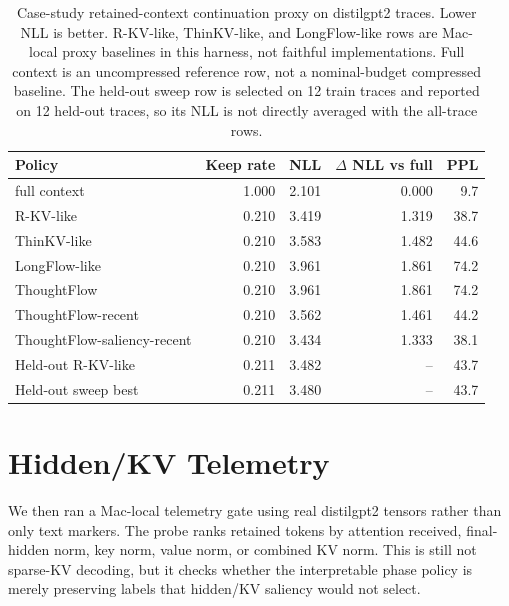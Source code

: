 \documentclass{article}
\begin{document}
\begin{table}[h]
\centering
\small
\begin{tabular}{lrrrr}
\toprule
Policy & Keep rate & NLL & $\Delta$ NLL vs full & PPL \\
\midrule
full context & 1.000 & 2.101 & 0.000 & 9.7 \\
R-KV-like & 0.210 & 3.419 & 1.319 & 38.7 \\
ThinKV-like & 0.210 & 3.583 & 1.482 & 44.6 \\
LongFlow-like & 0.210 & 3.961 & 1.861 & 74.2 \\
ThoughtFlow & 0.210 & 3.961 & 1.861 & 74.2 \\
ThoughtFlow-recent & 0.210 & 3.562 & 1.461 & 44.2 \\
ThoughtFlow-saliency-recent & 0.210 & 3.434 & 1.333 & 38.1 \\
Held-out R-KV-like & 0.211 & 3.482 & -- & 43.7 \\
Held-out sweep best & 0.211 & 3.480 & -- & 43.7 \\
\bottomrule
\end{tabular}
\caption{Case-study retained-context continuation proxy on distilgpt2 traces. Lower NLL is better. R-KV-like, ThinKV-like, and LongFlow-like rows are Mac-local proxy baselines in this harness, not faithful implementations. Full context is an uncompressed reference row, not a nominal-budget compressed baseline. The held-out sweep row is selected on 12 train traces and reported on 12 held-out traces, so its NLL is not directly averaged with the all-trace rows.}
\label{tab:case-study-retention}
\end{table}

\section{Hidden/KV Telemetry}

We then ran a Mac-local telemetry gate using real distilgpt2 tensors rather than only text markers. The probe ranks retained tokens by attention received, final-hidden norm, key norm, value norm, or combined KV norm. This is still not sparse-KV decoding, but it checks whether the interpretable phase policy is merely preserving labels that hidden/KV saliency would not select.
\end{document}
